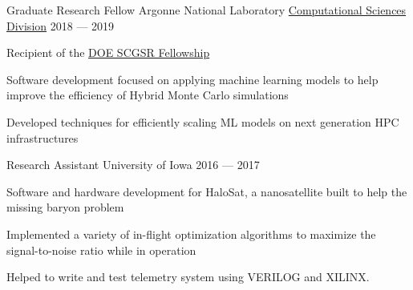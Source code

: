 \begin{cventries}
  \cventry
  {Graduate Research Fellow} %
  {Argonne National Laboratory} %
  {\href{https://www.anl.gov/cps}{\textcolor{awesome}{Computational Sciences Division}}} %
  {2018 --- 2019} %
  {
    \begin{cvitems}%
    \item{Recipient of the \href{https://science.osti.gov/wdts/scgsr}{DOE SCGSR Fellowship}}
    \item{Software development focused on applying machine learning models to
      help improve the efficiency of Hybrid Monte Carlo simulations}
    \item{Developed techniques for efficiently scaling ML models on next
        generation HPC infrastructures}
    \end{cvitems}
  }

  \cventry%
  {Research Assistant} %
  {University of Iowa} %
  {\color{awesome}{Department of Physics \& Astronomy}} %
  {2016 --- 2017} %
  {
  \begin{cvitems}%
    \item{Software and hardware development for HaloSat, a nanosatellite
      built to help the missing baryon problem}
    \item{Implemented a variety of in-flight optimization algorithms to
        maximize the signal-to-noise ratio while in operation}
    \item{Helped to write and test telemetry system using VERILOG and XILINX.}
  \end{cvitems}%
  }


\end{cventries}

